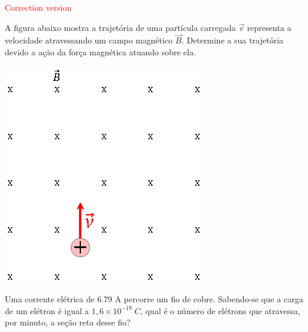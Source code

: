 \documentclass[12pt, addpoints]{exam}
\begin{document}
        \begin{center}
\textcolor{red}{\emph\Large Correction version}\end{center}
\begin{questions}
\begin{multicols*}{2}
\question[20] A ﬁgura abaixo mostra a trajetória de uma partícula carregada $\vec{v}$ representa a velocidade atravessando um campo magnético $\vec{B}$. Determine a sua trajetória devido a ação da força magnética atuando sobre ela.

\begin{center}
\begin{minipage}[c]{0.75\linewidth}
\includegraphics[width=\textwidth]{CEMAG001.jpg}
\end{minipage}

\end{center}
\begin{oneparchoices}
\end{oneparchoices}
\question[20] Uma corrente elétrica de    6.79 A percorre um ﬁo de cobre. Sabendo-se que a carga de um elétron é igual a $1,6\times 10^{-19}\;C$, qual é o número de elétrons que atravessa, por minuto, a seção reta desse ﬁo?


\end{multicols*}
\end{questions}
\end{document}
